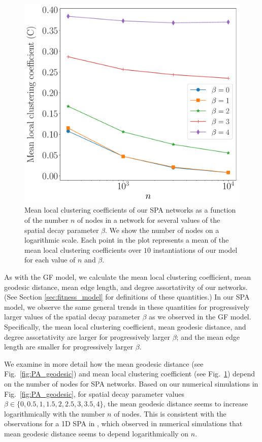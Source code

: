 \documentclass[%
 reprint,
 amsmath,amssymb,
 aps,
]{revtex4-1}
\begin{document}
\begin{figure}
    \centering
    \includegraphics[width=0.75\linewidth]{PA_log_clustering.pdf}
    \caption{Mean local clustering coefficients of our SPA networks as a function of the number $n$ of nodes in a network for several values of the spatial decay parameter $\beta$. We show the number of nodes on a logarithmic scale. Each point in the plot represents a mean of the mean local clustering coefficients over $10$ instantiations of our model for each value of $n$ and $\beta$.
    }
    \label{fig:PA_clustering}
\end{figure}


As with the GF model, we calculate the mean local clustering coefficient, mean geodesic distance, mean edge length, and degree assortativity of our networks. 
(See Section \ref{sec:fitness_model} for definitions of these quantities.) In our SPA model, we observe the same general trends in these quantities for progressively larger values of the spatial decay parameter $\beta$ as we observed in the GF model. Specifically, the mean local clustering coefficient, mean geodesic distance, and degree assortativity are larger for progressively larger $\beta$; and the mean edge length are smaller for progressively larger $\beta$.

We examine in more detail how the mean geodesic distance (see Fig.~\ref{fig:PA_geodesic}) and mean local clustering coefficient (see Fig.~\ref{fig:PA_clustering}) depend on
the number of nodes for SPA networks. 
Based on our numerical simulations in Fig.~\ref{fig:PA_geodesic}, for spatial decay parameter values $\beta \in \{ 0, 0.5, 1, 1.5, 2, 2.5, 3, 3.5, 4\}$, the mean geodesic distance seems to increase logarithmically %
with the number $n$ of nodes. This is consistent with the observations for a 1D SPA in \cite{SPA1}, which observed in numerical simulations that mean geodesic distance seems to depend logarithmically on $n$.
\end{document}
